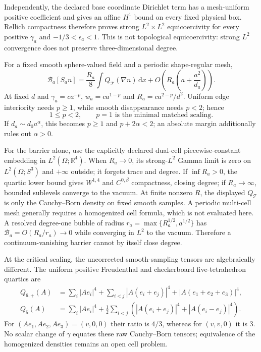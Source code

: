 \documentclass[11pt]{article}
\numberwithin{equation}{section}
\newcommand{\RR}{\mathbb R}
\newcommand{\dd}{\mathrm d}
\begin{document}
Independently, the declared base coordinate Dirichlet term has a
mesh-uniform positive coefficient and gives an affine
$H^1$ bound on every fixed physical box.  Rellich compactness therefore
proves strong $L^2\times L^2$ equicoercivity for every positive $\gamma_a$
and $-1/3<\epsilon_a<1$.  This is not topological equicoercivity: strong
$L^2$ convergence does not preserve three-dimensional degree.

For a fixed smooth sphere-valued field and a periodic shape-regular mesh,
\begin{equation}
 \mathcal B_a[S_an]=\frac{R_a}{8}\int Q_{\mathcal T}(\nabla n)\,\dd x
 +O\!\left(R_a\left(a+\frac{a^2}{d_a}\right)\right).
 \label{eq:e9-smooth}
\end{equation}
At fixed $d$ and $\gamma_a=ca^{-p}$,
$w_a=ca^{1-p}$ and $R_a=ca^{2-p}/d^2$.  Uniform edge interiority needs
$p\ge1$, while smooth disappearance needs $p<2$; hence
\begin{equation}
 \boxed{1\le p<2,\qquad p=1\text{ is the minimal matched scaling}.}
 \label{eq:e9-window}
\end{equation}
If $d_a\sim d_0a^\alpha$, this becomes $p\ge1$ and
$p+2\alpha<2$; an absolute margin additionally rules out $\alpha>0$.

For the barrier alone, use the explicitly declared dual-cell
piecewise-constant embedding in $L^2(\Omega;\RR^4)$.  When $R_a\to0$, its
strong-$L^2$ Gamma limit is zero on $L^2(\Omega;S^3)$ and $+\infty$ outside;
it forgets trace and degree.  If $\inf R_a>0$, the quartic lower bound gives
$W^{1,4}$ and $C^{0,\beta}$ compactness, closing degree; if
$R_a\to\infty$, bounded sublevels converge to the vacuum.  At finite
nonzero $R$, the displayed $Q_{\mathcal T}$ is only the Cauchy--Born density
on fixed smooth samples.  A periodic multi-cell mesh generally requires a
homogenized cell formula, which is not evaluated here.  A resolved degree-one
bubble of radius
$r_a=\max\{R_a^{1/2},a^{1/2}\}$ has
$\mathcal B_a=O(R_a/r_a)\to0$ while converging in $L^2$ to the vacuum.
Therefore a continuum-vanishing barrier cannot by itself close degree.

At the critical scaling, the uncorrected smooth-sampling tensors are
algebraically different.  The uniform positive Freudenthal and checkerboard
five-tetrahedron quartics are
\begin{align}
 Q_{6,+}(A)&=\sum_i|Ae_i|^4+\sum_{i<j}|A(e_i+e_j)|^4
              +|A(e_1+e_2+e_3)|^4,\\
 Q_5(A)&=\sum_i|Ae_i|^4+\frac12\sum_{i<j}
 \left(|A(e_i+e_j)|^4+|A(e_i-e_j)|^4\right).
\end{align}
For $(Ae_1,Ae_2,Ae_3)=(v,0,0)$ their ratio is $4/3$, whereas for
$(v,v,0)$ it is $3$.  No scalar change of $\gamma$ equates these raw
Cauchy--Born tensors; equivalence of the homogenized densities remains an
open cell problem.
\end{document}
